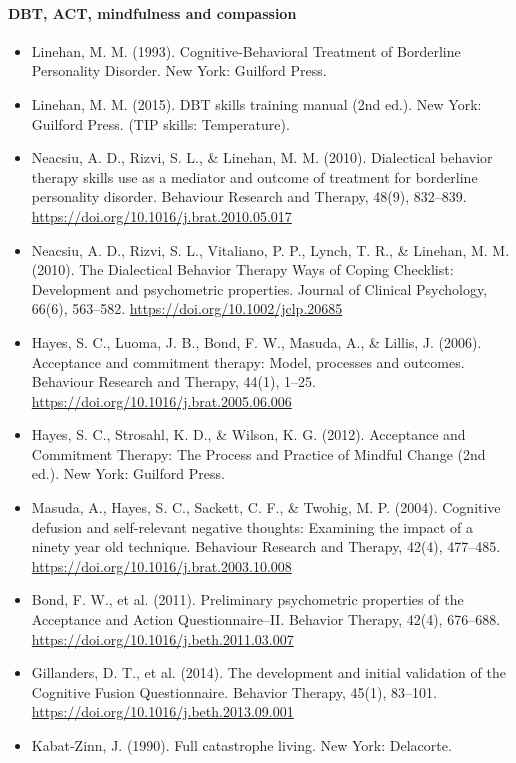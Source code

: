 \documentclass[10pt]{article}
\theoremstyle{remark}
\begin{document}
\paragraph{DBT, ACT, mindfulness and compassion}
\begin{itemize}[leftmargin=1em,itemsep=0pt,topsep=1pt,parsep=0pt]
\item Linehan, M. M. (1993). Cognitive-Behavioral Treatment of Borderline Personality Disorder. New York: Guilford Press.
\item Linehan, M. M. (2015). DBT skills training manual (2nd ed.). New York: Guilford Press. (TIP skills: Temperature).
\item Neacsiu, A. D., Rizvi, S. L., \& Linehan, M. M. (2010). Dialectical behavior therapy skills use as a mediator and outcome of treatment for borderline personality disorder. Behaviour Research and Therapy, 48(9), 832--839. \url{https://doi.org/10.1016/j.brat.2010.05.017}
\item Neacsiu, A. D., Rizvi, S. L., Vitaliano, P. P., Lynch, T. R., \& Linehan, M. M. (2010). The Dialectical Behavior Therapy Ways of Coping Checklist: Development and psychometric properties. Journal of Clinical Psychology, 66(6), 563--582. \url{https://doi.org/10.1002/jclp.20685}
\item Hayes, S. C., Luoma, J. B., Bond, F. W., Masuda, A., \& Lillis, J. (2006). Acceptance and commitment therapy: Model, processes and outcomes. Behaviour Research and Therapy, 44(1), 1--25. \url{https://doi.org/10.1016/j.brat.2005.06.006}
\item Hayes, S. C., Strosahl, K. D., \& Wilson, K. G. (2012). Acceptance and Commitment Therapy: The Process and Practice of Mindful Change (2nd ed.). New York: Guilford Press.
\item Masuda, A., Hayes, S. C., Sackett, C. F., \& Twohig, M. P. (2004). Cognitive defusion and self-relevant negative thoughts: Examining the impact of a ninety year old technique. Behaviour Research and Therapy, 42(4), 477--485. \url{https://doi.org/10.1016/j.brat.2003.10.008}
\item Bond, F. W., et al. (2011). Preliminary psychometric properties of the Acceptance and Action Questionnaire--II. Behavior Therapy, 42(4), 676--688. \url{https://doi.org/10.1016/j.beth.2011.03.007}
\item Gillanders, D. T., et al. (2014). The development and initial validation of the Cognitive Fusion Questionnaire. Behavior Therapy, 45(1), 83--101. \url{https://doi.org/10.1016/j.beth.2013.09.001}
\item Kabat-Zinn, J. (1990). Full catastrophe living. New York: Delacorte.

\end{itemize}
\end{document}
